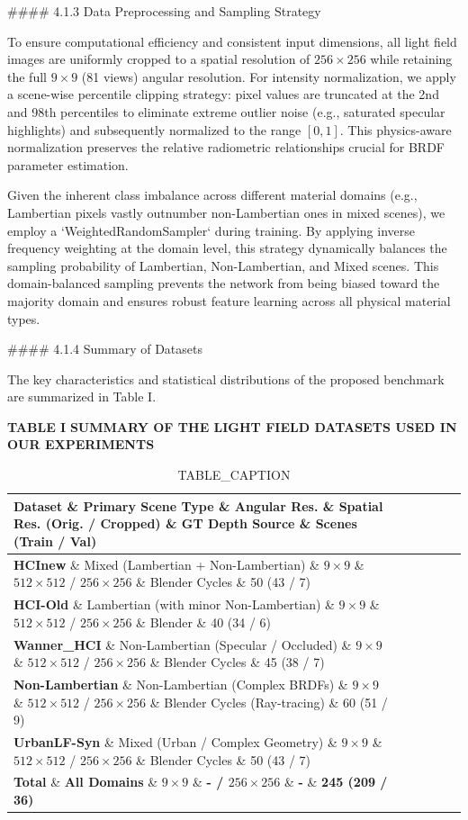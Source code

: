 \documentclass[journal]{IEEEtran}
\begin{document}
\#\#\#\# 4.1.3 Data Preprocessing and Sampling Strategy

To ensure computational efficiency and consistent input dimensions, all light field images are uniformly cropped to a spatial resolution of \(256 \times 256\) while retaining the full \(9 \times 9\) (81 views) angular resolution. For intensity normalization, we apply a scene-wise percentile clipping strategy: pixel values are truncated at the 2nd and 98th percentiles to eliminate extreme outlier noise (e.g., saturated specular highlights) and subsequently normalized to the range \([0, 1]\). This physics-aware normalization preserves the relative radiometric relationships crucial for BRDF parameter estimation.

Given the inherent class imbalance across different material domains (e.g., Lambertian pixels vastly outnumber non-Lambertian ones in mixed scenes), we employ a `WeightedRandomSampler` during training. By applying inverse frequency weighting at the domain level, this strategy dynamically balances the sampling probability of Lambertian, Non-Lambertian, and Mixed scenes. This domain-balanced sampling prevents the network from being biased toward the majority domain and ensures robust feature learning across all physical material types.

\#\#\#\# 4.1.4 Summary of Datasets

The key characteristics and statistical distributions of the proposed benchmark are summarized in Table I.

\textbf{TABLE I}
\textbf{SUMMARY OF THE LIGHT FIELD DATASETS USED IN OUR EXPERIMENTS}

\begin{table}[htbp]
\centering
\caption{TABLE_CAPTION}
\begin{tabular}{llllll}
\toprule
Dataset \& Primary Scene Type \& Angular Res. \& Spatial Res. (Orig. / Cropped) \& GT Depth Source \& Scenes (Train / Val) \\
\midrule
\textbf{HCInew} \& Mixed (Lambertian + Non-Lambertian) \& \(9 \times 9\) \& \(512 \times 512\) / \(256 \times 256\) \& Blender Cycles \& 50 (43 / 7) \\
\textbf{HCI-Old} \& Lambertian (with minor Non-Lambertian) \& \(9 \times 9\) \& \(512 \times 512\) / \(256 \times 256\) \& Blender \& 40 (34 / 6) \\
\textbf{Wanner_HCI} \& Non-Lambertian (Specular / Occluded) \& \(9 \times 9\) \& \(512 \times 512\) / \(256 \times 256\) \& Blender Cycles \& 45 (38 / 7) \\
\textbf{Non-Lambertian} \& Non-Lambertian (Complex BRDFs) \& \(9 \times 9\) \& \(512 \times 512\) / \(256 \times 256\) \& Blender Cycles (Ray-tracing) \& 60 (51 / 9) \\
\textbf{UrbanLF-Syn} \& Mixed (Urban / Complex Geometry) \& \(9 \times 9\) \& \(512 \times 512\) / \(256 \times 256\) \& Blender Cycles \& 50 (43 / 7) \\
\textbf{Total} \& \textbf{All Domains} \& \textbf{\(9 \times 9\)} \& \textbf{- / \(256 \times 256\)} \& \textbf{-} \& \textbf{245 (209 / 36)} \\
\bottomrule
\end{tabular}
\end{table}
\end{document}
